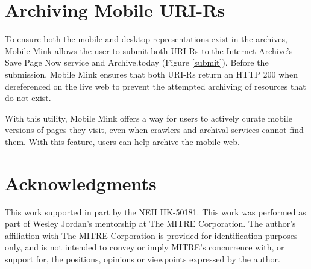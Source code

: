 \documentclass{sig-alternate-2013}
\begin{document}
\section{Archiving Mobile URI-Rs}
\label{flow}
To ensure both the mobile and desktop representations exist in the archives, Mobile Mink allows the user to submit both URI-Rs to the Internet Archive's Save Page Now service and Archive.today (Figure \ref{submit}). Before the submission, Mobile Mink ensures that both URI-Rs return an HTTP 200 when dereferenced on the live web to prevent the attempted archiving of resources that do not exist. 

With this utility, Mobile Mink offers a way for users to actively curate mobile versions of pages they visit, even when crawlers and archival services cannot find them. With this feature, users can help archive the mobile web.

\section{Acknowledgments}
This work supported in part by the NEH HK-50181. This work was performed as part of Wesley Jordan's mentorship at The MITRE Corporation. The author's affiliation with The MITRE Corporation is provided for identification purposes only, and is not intended to convey or imply MITRE's concurrence with, or support for, the positions, opinions or viewpoints expressed by the author. 



  
\end{document}
